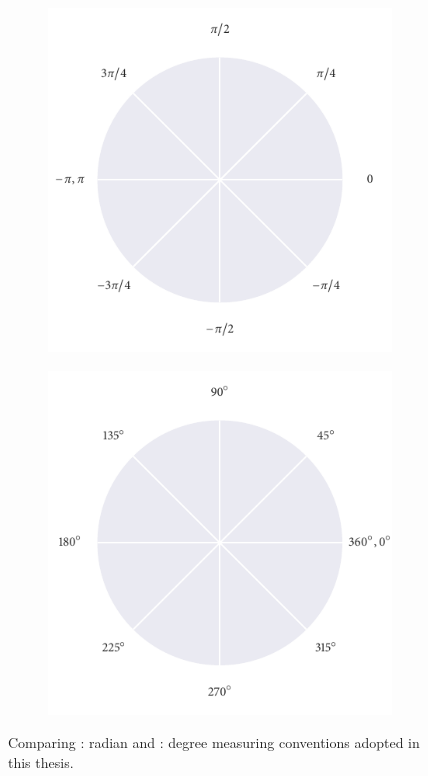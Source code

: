 \begin{figure}
\centering
	\begin{subfigure}[b]{0.5\textwidth}
		\includegraphics{radian_axes.pdf}
		\caption{}
		\label{subfig:radian_axes}
	\end{subfigure}%
	\begin{subfigure}[b]{0.5\textwidth}
		\centering
		\includegraphics{degree_axes.pdf}
		\caption{}
		\label{subfig:degree_axes}
	\end{subfigure}
	\caption{Comparing : radian and : degree measuring conventions adopted in this thesis.}
	\label{fig:compare_axes}
\end{figure}

